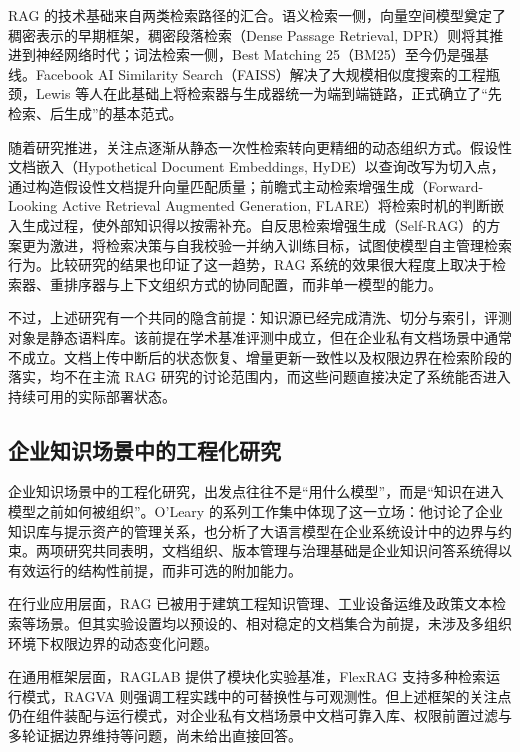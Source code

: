 RAG 的技术基础来自两类检索路径的汇合。语义检索一侧，向量空间模型\cite{salton1975vectorspace}奠定了稠密表示的早期框架，稠密段落检索（Dense Passage Retrieval, DPR）\cite{karpukhin2020dpr}则将其推进到神经网络时代；词法检索一侧，Best Matching 25（BM25）\cite{robertson2009bm25}至今仍是强基线。Facebook AI Similarity Search（FAISS）\cite{johnson2021faiss}解决了大规模相似度搜索的工程瓶颈，Lewis 等人在此基础上将检索器与生成器统一为端到端链路，正式确立了“先检索、后生成”的基本范式\cite{lewis2020rag}。

随着研究推进，关注点逐渐从静态一次性检索转向更精细的动态组织方式。假设性文档嵌入（Hypothetical Document Embeddings, HyDE）以查询改写为切入点，通过构造假设性文档提升向量匹配质量\cite{gao2023hyde}；前瞻式主动检索增强生成（Forward-Looking Active Retrieval Augmented Generation, FLARE）将检索时机的判断嵌入生成过程，使外部知识得以按需补充\cite{jiang2023flare}。自反思检索增强生成（Self-RAG）的方案更为激进，将检索决策与自我校验一并纳入训练目标，试图使模型自主管理检索行为\cite{asai2024selfrag}。比较研究的结果也印证了这一趋势，RAG 系统的效果很大程度上取决于检索器、重排序器与上下文组织方式的协同配置，而非单一模型的能力\cite{rahman2025comparative}。

不过，上述研究有一个共同的隐含前提：知识源已经完成清洗、切分与索引，评测对象是静态语料库\cite{lewis2020rag,karpukhin2020dpr,jiang2023flare,asai2024selfrag}。该前提在学术基准评测中成立，但在企业私有文档场景中通常不成立。文档上传中断后的状态恢复、增量更新一致性以及权限边界在检索阶段的落实，均不在主流 RAG 研究的讨论范围内，而这些问题直接决定了系统能否进入持续可用的实际部署状态。

\subsection{企业知识场景中的工程化研究}

企业知识场景中的工程化研究，出发点往往不是“用什么模型”，而是“知识在进入模型之前如何被组织”。O'Leary 的系列工作集中体现了这一立场：他讨论了企业知识库与提示资产的管理关系\cite{oleary2024km}，也分析了大语言模型在企业系统设计中的边界与约束\cite{oleary2024enterprise}。两项研究共同表明，文档组织、版本管理与治理基础是企业知识问答系统得以有效运行的结构性前提，而非可选的附加能力。

在行业应用层面，RAG 已被用于建筑工程知识管理\cite{wang2025buildingkm}、工业设备运维\cite{rubio2025industrialkm}及政策文本检索等场景\cite{policyrag2025}。但其实验设置均以预设的、相对稳定的文档集合为前提，未涉及多组织环境下权限边界的动态变化问题。

在通用框架层面，RAGLAB 提供了模块化实验基准\cite{zhang2024raglab}，FlexRAG 支持多种检索运行模式\cite{zhang2025flexrag}，RAGVA 则强调工程实践中的可替换性与可观测性\cite{vogelsang2025ragva}。但上述框架的关注点仍在组件装配与运行模式，对企业私有文档场景中文档可靠入库、权限前置过滤与多轮证据边界维持等问题，尚未给出直接回答。


